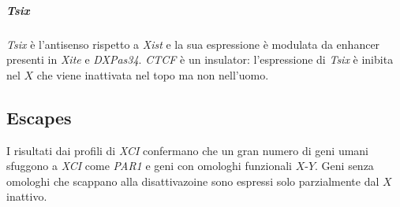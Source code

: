 				\subparagraph{\emph{Tsix}}
				\emph{Tsix} \`e l'antisenso rispetto a \emph{Xist} e la sua espressione \`e modulata da enhancer presenti in \emph{Xite} e \emph{DXPas34}.
				\emph{CTCF} \`e un insulator: l'espressione di \emph{Tsix} \`e inibita nel $X$ che viene inattivata nel topo ma non nell'uomo.

				\subsection{Escapes}
				I risultati dai profili di \emph{XCI} confermano che un gran numero di geni umani sfuggono a \emph{XCI} come \emph{PAR1} e geni con omologhi funzionali $X$-$Y$.
				Geni senza omologhi che scappano alla disattivazoine sono espressi solo parzialmente dal $X$ inattivo.
